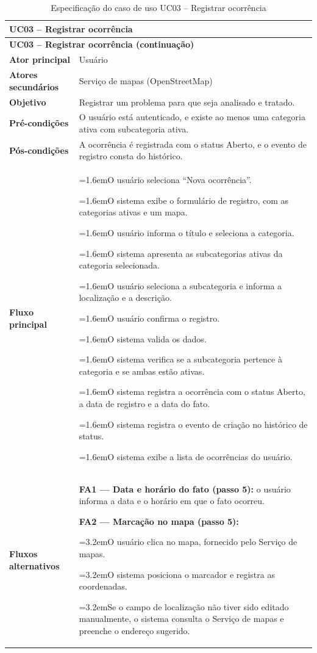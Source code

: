 \documentclass[12pt,a4paper]{article}
\newcommand{\ucitem}[2]{\par\noindent\hangindent=1.6em\hangafter=1\makebox[1.6em][l]{#1}#2}
\newcommand{\ucsubitem}[2]{\par\noindent\hangindent=3.2em\hangafter=1\hspace*{1.6em}\makebox[1.6em][l]{#1}#2}
\begin{document}
\begin{longtable}{|p{}|p{}|}
\caption{Especificação do caso de uso UC03 -- Registrar ocorrência}
\label{tab:uc03} \\
\hline
\multicolumn{2}{|l|}{\textbf{UC03 -- Registrar ocorrência}} \\
\hline
\endfirsthead

\hline
\multicolumn{2}{|l|}{\textbf{UC03 -- Registrar ocorrência (continuação)}} \\
\hline
\endhead

\hline
\endfoot
\textbf{Ator principal} & Usuário \\ \hline
\textbf{Atores secundários} & Serviço de mapas (OpenStreetMap) \\ \hline
\textbf{Objetivo} & Registrar um problema para que seja analisado e tratado. \\ \hline
\textbf{Pré-condições} & O usuário está autenticado, e existe ao menos uma categoria ativa com subcategoria ativa. \\ \hline
\textbf{Pós-condições} & A ocorrência é registrada com o status Aberto, e o evento de registro consta do histórico. \\ \hline
\textbf{Fluxo principal} &
\ucitem{1.}{O usuário seleciona ``Nova ocorrência''.}
\ucitem{2.}{O sistema exibe o formulário de registro, com as categorias ativas e um mapa.}
\ucitem{3.}{O usuário informa o título e seleciona a categoria.}
\ucitem{4.}{O sistema apresenta as subcategorias ativas da categoria selecionada.}
\ucitem{5.}{O usuário seleciona a subcategoria e informa a localização e a descrição.}
\ucitem{6.}{O usuário confirma o registro.}
\ucitem{7.}{O sistema valida os dados.}
\ucitem{8.}{O sistema verifica se a subcategoria pertence à categoria e se ambas estão ativas.}
\ucitem{9.}{O sistema registra a ocorrência com o status Aberto, a data de registro e a data do fato.}
\ucitem{10.}{O sistema registra o evento de criação no histórico de status.}
\ucitem{11.}{O sistema exibe a lista de ocorrências do usuário.} \\ \hline
\textbf{Fluxos alternativos} &
\noindent \textbf{FA1 — Data e horário do fato (passo 5):} o usuário informa a data e o horário em que o fato ocorreu.
\par\smallskip\noindent \textbf{FA2 — Marcação no mapa (passo 5):}
\ucsubitem{1.}{O usuário clica no mapa, fornecido pelo Serviço de mapas.}
\ucsubitem{2.}{O sistema posiciona o marcador e registra as coordenadas.}
\ucsubitem{3.}{Se o campo de localização não tiver sido editado manualmente, o sistema consulta o Serviço de mapas e preenche o endereço sugerido.}

\end{longtable}
\end{document}
